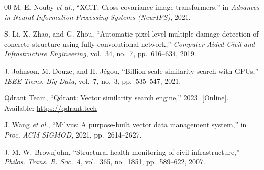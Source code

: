 \documentclass[conference]{IEEEtran}
\begin{document}
\begin{thebibliography}{00}
M. El-Nouby \textit{et al.}, ``XCiT: Cross-covariance image transformers,'' in \textit{Advances in Neural Information Processing Systems (NeurIPS)}, 2021.

S. Li, X. Zhao, and G. Zhou, ``Automatic pixel-level multiple damage detection of concrete structure using fully convolutional network,'' \textit{Computer-Aided Civil and Infrastructure Engineering}, vol.~34, no.~7, pp.~616--634, 2019.

J. Johnson, M. Douze, and H. J\'{e}gou, ``Billion-scale similarity search with GPUs,'' \textit{IEEE Trans. Big Data}, vol.~7, no.~3, pp.~535--547, 2021.

Qdrant Team, ``Qdrant: Vector similarity search engine,'' 2023. [Online]. Available: \url{https://qdrant.tech}

J. Wang \textit{et al.}, ``Milvus: A purpose-built vector data management system,'' in \textit{Proc. ACM SIGMOD}, 2021, pp.~2614--2627.

J. M. W. Brownjohn, ``Structural health monitoring of civil infrastructure,'' \textit{Philos. Trans. R. Soc. A}, vol.~365, no.~1851, pp.~589--622, 2007.

\end{thebibliography}
\end{document}
